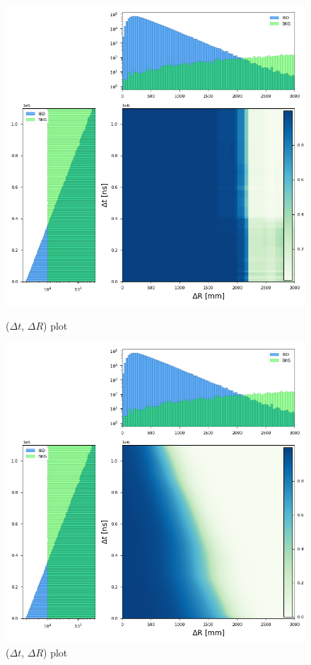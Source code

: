 \begin{figure}[h!]
	\centering
	\begin{minipage}{0.5\textwidth}
		\centering
		\includegraphics[width=0.8\linewidth]{Images/dr_dt_xgboost}
		\caption{($\Delta t$, $\Delta R$) plot}
		\label{fig:dr_dt_xgboost}
	\end{minipage}%
	\begin{minipage}{0.5\textwidth}
		\centering
		\includegraphics[width=0.8\linewidth]{Images/dr_dt_pytorch}
		\caption{($\Delta t$, $\Delta R$) plot}
		\label{fig:dr_dt_pytorch}
	\end{minipage}
\end{figure}


